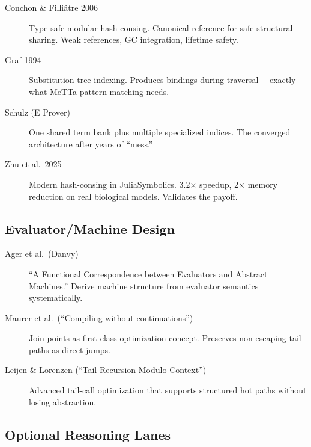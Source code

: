 \documentclass[11pt]{article}
\begin{document}
\begin{description}
\item[Conchon \& Filliâtre 2006]
  Type-safe modular hash-consing.  Canonical reference for safe
  structural sharing.  Weak references, GC integration, lifetime safety.

\item[Graf 1994]
  Substitution tree indexing.  Produces bindings during traversal---
  exactly what MeTTa pattern matching needs.

\item[Schulz (E Prover)]
  One shared term bank plus multiple specialized indices.  The
  converged architecture after years of ``mess.''

\item[Zhu et al.\ 2025]
  Modern hash-consing in JuliaSymbolics.  3.2$\times$ speedup, 2$\times$
  memory reduction on real biological models.  Validates the payoff.
\end{description}

\subsection{Evaluator/Machine Design}

\begin{description}
\item[Ager et al.\ (Danvy)]
  ``A Functional Correspondence between Evaluators and Abstract Machines.''
  Derive machine structure from evaluator semantics systematically.

\item[Maurer et al.\ (``Compiling without continuations'')]
  Join points as first-class optimization concept.  Preserves non-escaping
  tail paths as direct jumps.

\item[Leijen \& Lorenzen (``Tail Recursion Modulo Context'')]
  Advanced tail-call optimization that supports structured hot paths
  without losing abstraction.
\end{description}

\subsection{Optional Reasoning Lanes}
\end{document}
